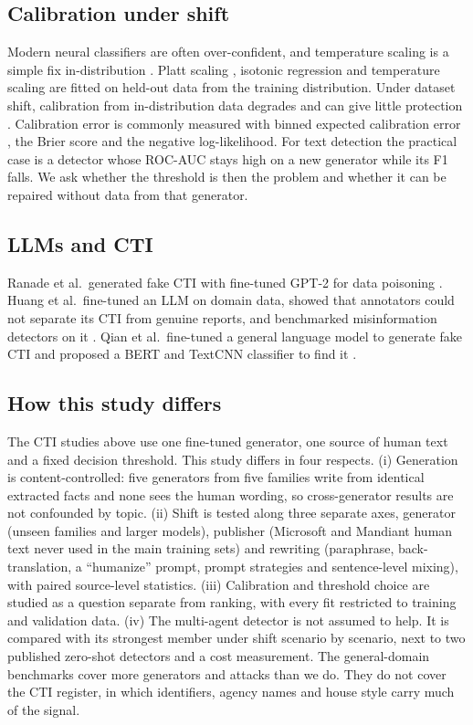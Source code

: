 \documentclass[journal]{IEEEtran}
\begin{document}
\subsection{Calibration under shift}
Modern neural classifiers are often over-confident, and temperature scaling is a simple fix in-distribution
\cite{Guo_2017}. Platt scaling \cite{Platt_1999}, isotonic regression \cite{Zadrozny_2002} and temperature scaling
are fitted on held-out data from the training distribution. Under dataset shift, calibration from in-distribution
data degrades and can give little protection \cite{Ovadia_2019}. Calibration error is commonly measured with binned
expected calibration error \cite{Naeini_2015}, the Brier score and the negative log-likelihood. For text detection
the practical case is a detector whose ROC-AUC stays high on a new generator while its F1 falls. We ask whether the
threshold is then the problem and whether it can be repaired without data from that generator.

\subsection{LLMs and CTI}
Ranade et al.\ generated fake CTI with fine-tuned GPT-2 for data poisoning \cite{Ranade_2021}. Huang et al.\
fine-tuned an LLM on domain data, showed that annotators could not separate its CTI from genuine reports, and
benchmarked misinformation detectors on it \cite{Huang_2025}. Qian et al.\ fine-tuned a general language model to
generate fake CTI and proposed a BERT and TextCNN classifier to find it \cite{Qian_2025}.

\subsection{How this study differs}
The CTI studies above use one fine-tuned generator, one source of human text and a fixed decision threshold. This
study differs in four respects. (i) Generation is content-controlled: five generators from five families write from
identical extracted facts and none sees the human wording, so cross-generator results are not confounded by topic.
(ii) Shift is tested along three separate axes, generator (unseen families and larger models), publisher (Microsoft
and Mandiant human text never used in the main training sets) and rewriting (paraphrase, back-translation, a
``humanize'' prompt, prompt strategies and sentence-level mixing), with paired source-level statistics.
(iii) Calibration and threshold choice are studied as a question separate from ranking, with every fit restricted to
training and validation data. (iv) The multi-agent detector is not assumed to help. It is compared with its
strongest member under shift scenario by scenario, next to two published zero-shot detectors and a cost
measurement. The general-domain benchmarks \cite{Wang_2024,Dugan_2024,Wu_2024} cover more generators and attacks
than we do. They do not cover the CTI register, in which identifiers, agency names and house style carry much of
the signal.
\end{document}
